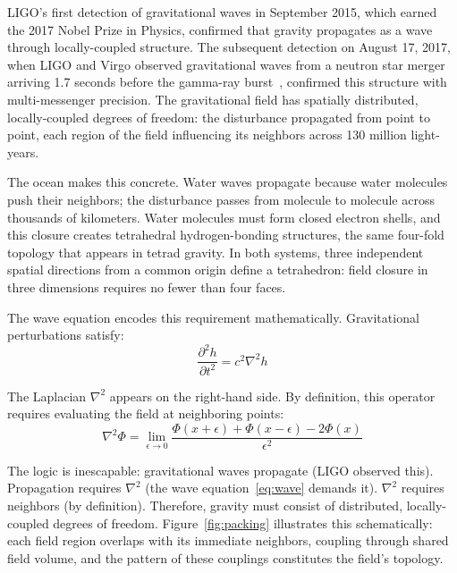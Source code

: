 \documentclass[aps,prd,preprint,superscriptaddress,showpacs,preprintnumbers,amsmath,amssymb,nofootinbib]{revtex4-2}
\begin{document}
LIGO's first detection of gravitational waves in September 2015, which earned the 2017 Nobel Prize in Physics, confirmed that gravity propagates as a wave through locally-coupled structure. The subsequent detection on August 17, 2017, when LIGO and Virgo observed gravitational waves from a neutron star merger arriving 1.7 seconds before the gamma-ray burst~\cite{gw170817}, confirmed this structure with multi-messenger precision. The gravitational field has spatially distributed, locally-coupled degrees of freedom: the disturbance propagated from point to point, each region of the field influencing its neighbors across 130 million light-years.

The ocean makes this concrete. Water waves propagate because water molecules push their neighbors; the disturbance passes from molecule to molecule across thousands of kilometers. Water molecules must form closed electron shells, and this closure creates tetrahedral hydrogen-bonding structures, the same four-fold topology that appears in tetrad gravity. In both systems, three independent spatial directions from a common origin define a tetrahedron: field closure in three dimensions requires no fewer than four faces.

The wave equation encodes this requirement mathematically. Gravitational perturbations satisfy:
\begin{equation}
\frac{\partial^2 h}{\partial t^2} = c^2 \nabla^2 h
\label{eq:wave}
\end{equation}

The Laplacian $\nabla^2$ appears on the right-hand side. By definition, this operator requires evaluating the field at neighboring points:
\begin{equation}
\nabla^2 \Phi = \lim_{\epsilon \to 0} \frac{\Phi(x+\epsilon) + \Phi(x-\epsilon) - 2\Phi(x)}{\epsilon^2}
\label{eq:laplacian}
\end{equation}

The logic is inescapable: gravitational waves propagate (LIGO observed this). Propagation requires $\nabla^2$ (the wave equation~\eqref{eq:wave} demands it). $\nabla^2$ requires neighbors (by definition). Therefore, gravity must consist of distributed, locally-coupled degrees of freedom. Figure~\ref{fig:packing} illustrates this schematically: each field region overlaps with its immediate neighbors, coupling through shared field volume, and the pattern of these couplings constitutes the field's topology.
\end{document}

